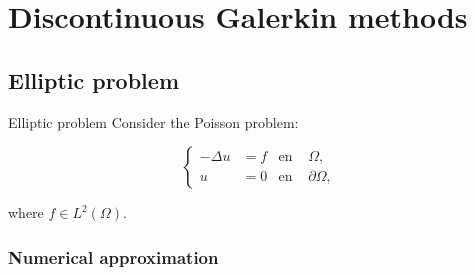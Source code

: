 \section{Discontinuous Galerkin methods}

	\subsection{Elliptic problem}

	\begin{frame}{Elliptic problem}
		Consider the Poisson problem:
		\begin{block}{}
		\begin{equation*}
		\left\{
		\begin{aligned}
		-\Delta u&=f & \text{en } &\Omega, \\
		u&=0 & \text{en } &\partial\Omega,
		\end{aligned}
		\right.
		\end{equation*}
		\end{block}
		where $f\in L^2\left(\Omega\right)$.
	\end{frame}

	\subsubsection{Numerical approximation}

